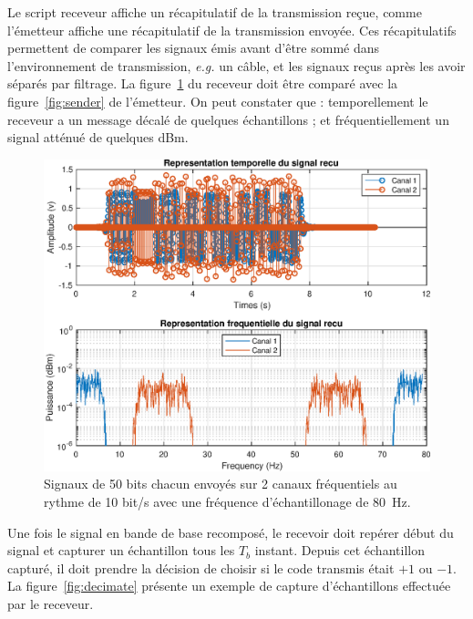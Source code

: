 \documentclass[10pt, oneside, a4paper]{article}
\begin{document}
Le script receveur affiche un récapitulatif de la transmission reçue, comme l'émetteur affiche une récapitulatif de la transmission envoyée.
Ces récapitulatifs permettent de comparer les signaux émis avant d'être sommé dans l'environnement de transmission, \textit{e.g.} un câble, et les signaux reçus après les avoir séparés par filtrage.
La figure~\ref{fig:receiver} du receveur doit être comparé avec la figure~\ref{fig:sender} de l'émetteur.
On peut constater que : temporellement le receveur a un message décalé de quelques échantillons ; et fréquentiellement un signal atténué de quelques dBm.

\begin{figure}[p]
	\centering
	\includegraphics[height=0.45\textheight]{eps/receiver.eps}
	\caption{Signaux de 50 bits chacun envoyés sur 2 canaux fréquentiels au rythme de 10 bit/s
			 avec une fréquence d'échantillonage de \SI{80}{\hertz}.}
	\label{fig:receiver}
\end{figure}

Une fois le signal en bande de base recomposé, le recevoir doit repérer début du signal et capturer un échantillon tous les $T_b$ instant.
Depuis cet échantillon capturé, il doit prendre la décision de choisir si le code transmis était $+1$ ou $-1$.
La figure~\ref{fig:decimate} présente un exemple de capture d'échantillons effectuée par le receveur.
\end{document}
